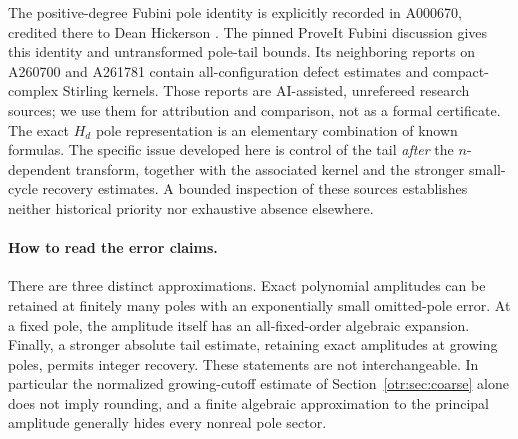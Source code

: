 \documentclass[11pt,a4paper]{article}
\theoremstyle{definition}\newtheorem{definition}[theorem]{Definition}
\theoremstyle{remark}\newtheorem{remark}[theorem]{Remark}
\begin{document}
The positive-degree Fubini pole identity is explicitly recorded in A000670, credited there to Dean Hickerson \cite{oeisfubini}. The pinned ProveIt Fubini discussion \cite{transseries} gives this identity and untransformed pole-tail bounds. Its neighboring reports on A260700 and A261781 \cite{pdc,mc} contain all-configuration defect estimates and compact-complex Stirling kernels. Those reports are AI-assisted, unrefereed research sources; we use them for attribution and comparison, not as a formal certificate. The exact $H_d$ pole representation is an elementary combination of known formulas. The specific issue developed here is control of the tail \emph{after} the $n$-dependent transform, together with the associated kernel and the stronger small-cycle recovery estimates. A bounded inspection of these sources establishes neither historical priority nor exhaustive absence elsewhere.

\paragraph{How to read the error claims.}
There are three distinct approximations. Exact polynomial amplitudes can be retained at finitely many poles with an exponentially small omitted-pole error. At a fixed pole, the amplitude itself has an all-fixed-order algebraic expansion. Finally, a stronger absolute tail estimate, retaining exact amplitudes at growing poles, permits integer recovery. These statements are not interchangeable. In particular the normalized growing-cutoff estimate of Section~\ref{otr:sec:coarse} alone does not imply rounding, and a finite algebraic approximation to the principal amplitude generally hides every nonreal pole sector.
\end{document}
